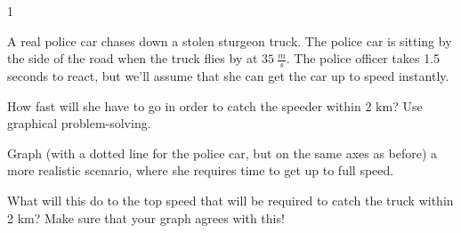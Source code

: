 
\AddToShipoutPicture*{\BackgroundPic}

\addtocounter {ProbNum} {1}

 
{\bf \Large{}}A real police car chases down a stolen sturgeon truck.  The police car is sitting by the side of the road when the truck flies by at ${35~\tfrac{m}{s}}$.  The police officer takes 1.5 seconds to react, but we'll assume that she can get the car up to speed instantly.


\bigskip
How fast will she have to go in order to catch the speeder within 2 km? Use graphical problem-solving.
 
\vfill
Graph (with a dotted line for the police car, but on the same axes as before) a more realistic scenario, where she requires time to get up to full speed.

\bigskip

What will this do to the top speed that will be required to catch the truck within 2 km?  Make sure that your graph agrees with this!
\vspace{15mm}
\newpage
